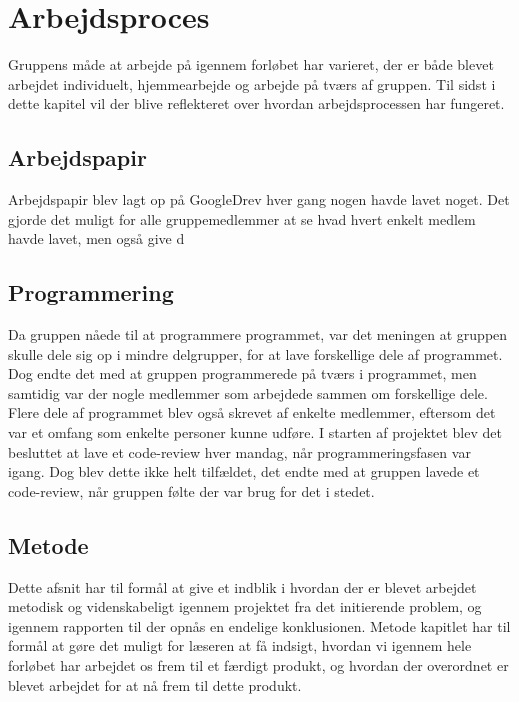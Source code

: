 \chapter{Arbejdsproces}\label{Arbejdsproces}
Gruppens måde at arbejde på igennem forløbet har varieret, der er både blevet arbejdet individuelt, hjemmearbejde og arbejde på tværs af gruppen. Til sidst i dette kapitel vil der blive reflekteret over hvordan arbejdsprocessen har fungeret.


\section{Arbejdspapir}\label{Arbejdspapir}
Arbejdspapir blev lagt op på GoogleDrev hver gang nogen havde lavet noget. Det gjorde det muligt for alle gruppemedlemmer at se hvad hvert enkelt medlem havde lavet, men også give d 

\section{Programmering}\label{Programmering}

Da gruppen nåede til at programmere programmet, var det meningen at gruppen skulle dele sig op i mindre delgrupper, for at lave forskellige dele af programmet. Dog endte det med at gruppen programmerede på tværs i programmet, men samtidig var der nogle medlemmer som arbejdede sammen om forskellige dele. Flere dele af programmet blev også skrevet af enkelte medlemmer, eftersom det var et omfang som enkelte personer kunne udføre. I starten af projektet blev det besluttet at lave et code-review hver mandag, når programmeringsfasen var igang. Dog blev dette ikke helt tilfældet, det endte med at gruppen lavede et code-review, når gruppen følte der var brug for det i stedet. 


\section{Metode}\label{Metode}

Dette afsnit har til formål at give et indblik i hvordan der er blevet arbejdet metodisk og videnskabeligt igennem projektet fra det initierende problem, og igennem rapporten til der opnås en endelige konklusionen. Metode kapitlet har til formål at gøre det muligt for læseren at få indsigt, hvordan vi igennem hele forløbet har arbejdet os frem til et færdigt produkt, og hvordan der overordnet er blevet arbejdet for at nå frem til dette produkt. 

